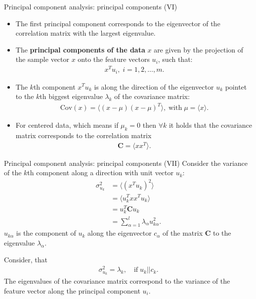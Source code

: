 \documentclass[aspectratio=169,t]{beamer}
\begin{document}
  {
    \begin{frame}{Principal component analysis: principal components (VI)}
    \begin{itemize}
      \item The first principal component corresponds to the eigenvector of the correlation matrix with the largest eigenvalue.
      \item The \textbf{\color{airforceblue}principal components of the data} $x$ are given by the projection of the sample vector $x$ onto the feature vectors $u_i$, such that:
      \begin{align}
        x^Tu_i, \; i = 1, 2, \ldots, m.
      \end{align}
      \item The $k$th component $x^Tu_k$ is along the direction of the eigenvector $u_k$ pointet to the $k$th biggest eigenvalue $\lambda_k$ of the covariance matrix:
      \begin{align}
        \text{Cov}(x) = \langle (x-\mu) (x-\mu)^T \rangle, \; \text{with} \; \mu = \langle x \rangle.
      \end{align}
      \item For centered data, which means if $\mu_k = 0$ then $\forall k$ it holds that the covariance matrix corresponds to the correlation matrix
      \begin{align}
        \mathbf{C} = \langle xx^T \rangle.
      \end{align}
    \end{itemize}
    \end{frame}
  }

  {
    \begin{frame}{Principal component analysis: principal components (VII)}
    Consider the variance of the $k$th component along a direction with unit vector $u_k$:
    \begin{align}
      \sigma_{u_k}^2 &= \langle (x^Tu_k)^2 \rangle\\
                     &= \langle u_k^T xx^T u_k \rangle\\
                     &= u_k^T \mathbf{C} u_k\\
                     &= \sum_{\alpha = 1}^{l}\lambda_{\alpha}u_{k\alpha}^2.
    \end{align}
    $u_{k\alpha}$ is the component of $u_k$ along the eigenvector $c_\alpha$ of the matrix $\mathbf{C}$ to the eigenvalue $\lambda_\alpha$.

    Consider, that
    \begin{align}
      \sigma_{u_k}^{2} = \lambda_k, \quad \text{if} \; u_k \vert \vert c_k.
    \end{align}
    The eigenvalues of the covariance matrix correspond to the variance of the feature vector along the principal component $u_i$.
    \end{frame}
  }
\end{document}
